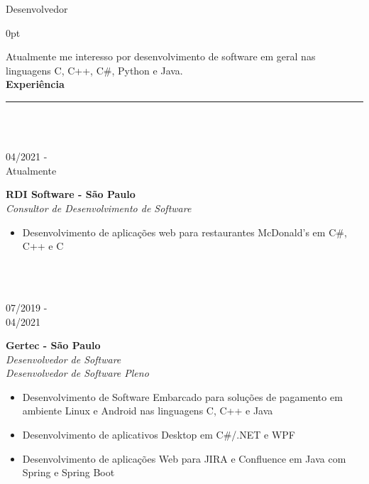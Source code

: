 \documentclass[a4paper]{article}
\begin{document}
\LARGE Desenvolvedor
\vspace{12.5pt}
\begin{adjustwidth}{\parindent}{0pt}
\begin{minipage}[t]{0.65\textwidth}
\large Atualmente me interesso por desenvolvimento de software em geral nas linguagens C, C++, C\#, Python e Java.\\

\Large{\textbf{Experiência}} \normalsize \\ \rule{\textwidth}{0.5pt} \\ \\

\begin{minipage}[t]{0.2\textwidth}
	\large{04/2021 - \\ Atualmente}
\end{minipage}
\begin{minipage}[t]{0.8\textwidth}
	{
		\setlength{\parskip}{5.5pt}
		\Large{\textbf{RDI Software - São Paulo}} \\
		\large{\textit{Consultor de Desenvolvimento de Software}}
		\begin{itemize}
			\item \normalsize{Desenvolvimento de aplicações web para restaurantes McDonald's em C\#, C++ e C}
		\end{itemize}
	}
\end{minipage} \\ \\

\begin{minipage}[t]{0.2\textwidth}
\large{07/2019 - \\ 04/2021}
\end{minipage}
\begin{minipage}[t]{0.8\textwidth}
{
  \setlength{\parskip}{5.5pt}
  \Large{\textbf{Gertec - São Paulo}} \\
  \large{\textit{Desenvolvedor de Software}} \\
  \large{\textit{Desenvolvedor de Software Pleno}}
  \begin{itemize}
    \item \normalsize{Desenvolvimento de Software Embarcado para soluções de pagamento em ambiente Linux e Android nas linguagens C, C++ e Java}
    \item \normalsize{Desenvolvimento de aplicativos Desktop em C\#/.NET e WPF}
    \item \normalsize{Desenvolvimento de aplicações Web para JIRA e Confluence em Java com Spring e Spring Boot}
  \end{itemize}
}
\end{minipage} \\ \\


\end{minipage}
\end{adjustwidth}
\end{document}
